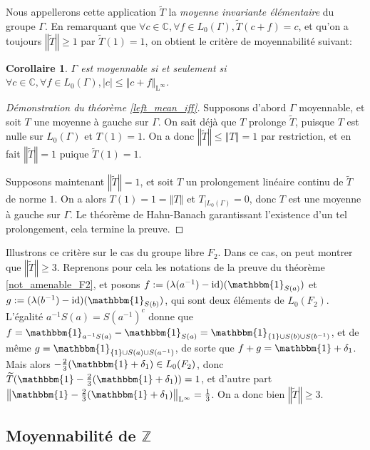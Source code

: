 \documentclass[a4paper,12pt]{article}
\newtheorem{corollary}[theorem]{Corollaire}
\newcommand{\Z}{\mathbb{Z}}
\newcommand{\C}{\mathbb{C}}
\newcommand{\norm}[1]{\left\Vert #1\right\Vert}
\newcommand{\abs}[1]{\left\vert#1\right\vert}
\newcommand{\set}[1]{\left\{ #1 \right\}}
\newcommand{\indic}{\mathbbm{1}}
\newcommand{\ssi}{si et seulement si }
\newcommand{\inv}{^{-1}}
\newcommand{\compl}{^c}
\DeclareMathOperator{\id}{id}
\begin{document}
Nous appellerons cette application $\widetilde{T}$ la \emph{moyenne invariante élémentaire} du groupe $\Gamma$. 
En remarquant que $\forall c\in\C, \forall f\in L_0(\Gamma), \widetilde{T}(c + f) = c$, et qu'on a toujours 
$\norm{\widetilde{T}}\ge1$ par $\widetilde{T}(1) = 1$, on obtient le critère de moyennabilité suivant:

\begin{corollary}\label{amenable_iff_L0}
    $\Gamma$ est moyennable \ssi $\forall c\in\C, \forall f\in L_0(\Gamma), \abs{c}\le\norm{c + f}_{\mathrm{L}^\infty}$.
\end{corollary}

\begin{proof}[Démonstration du théorème \ref{left_mean_iff}]
    Supposons d'abord $\Gamma$ moyennable, et soit $T$ une moyenne à gauche sur $\Gamma$.
    On sait déjà que $T$ prolonge $\widetilde{T}$, puisque $T$ est nulle sur $L_0(\Gamma)$ et 
    $T(1)=1$. On a donc $\norm{\widetilde{T}}\le\norm{T}=1$ par restriction, et en fait $\norm{\widetilde{T}} = 1$
    puique $\widetilde{T}(1)=1$. 

    Supposons maintenant $\norm{\widetilde{T}}=1$, et soit $T$ un prolongement linéaire continu de $\widetilde{T}$ de norme $1$.
    On a alors $T(1)=1=\norm{T}$ et $T_{|L_0(\Gamma)} = 0$, donc $T$ est une moyenne à gauche sur $\Gamma$. Le théorème de Hahn-Banach
    garantissant l'existence d'un tel prolongement, cela termine la preuve.
\end{proof}

Illustrons ce critère sur le cas du groupe libre $F_2$. Dans ce cas, on peut montrer que $\norm{\widetilde{T}}\ge3$.
Reprenons pour cela les notations de la preuve du théorème \ref{not_amenable_F2}, et posons $f := (\lambda(a\inv)-\id)(\indic_{S(a)})$ et 
$g:=(\lambda(b\inv) - \id)(\indic_{S(b)})$, qui sont deux éléments de $L_0(F_2)$. L'égalité $a\inv S(a) = S(a\inv)\compl$ donne que 
$f = \indic_{a\inv S(a)} - \indic_{S(a)} = \indic_{\set{1}\cup S(b)\cup S(b\inv)}$, et de même 
$g = \indic_{\set{1}\cup S(a)\cup S(a\inv)}$, de sorte que $f+g=\indic + \delta_1$. Mais alors 
$-\frac23(\indic+\delta_1)\in L_0(F_2)$, donc $\widetilde{T}(\indic - \frac23(\indic+\delta_1)) = 1$, 
et d'autre part $\norm{\indic - \frac23(\indic+\delta_1)}_{\mathrm{L}^\infty}=\frac13$. 
On a donc bien $\norm{\widetilde{T}}\geq3$.

\subsection{Moyennabilité \texorpdfstring{de $\Z$}{du groupe des entiers}}
\end{document}

